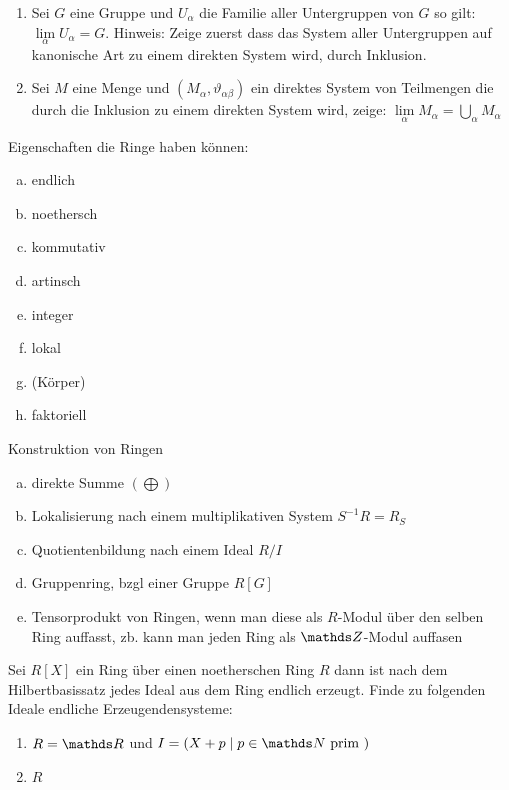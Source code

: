 \documentclass[ngerman, parskip=half, titlepage=false]{scrartcl}
\begin{document}
\begin{Lem} 
  \begin{enumerate}[1)]
  \item Sei $G$ eine Gruppe und $U_\alpha$ die Familie aller
    Untergruppen von $G$ so gilt: $\lim\limits_{\alpha} U_\alpha = G$.
    Hinweis: Zeige zuerst dass das System aller Untergruppen auf kanonische Art
    zu einem direkten System wird, durch Inklusion.
  \item Sei $M$ eine Menge und $(M_\alpha, \vartheta_{\alpha\beta})$
    ein direktes System von Teilmengen die durch die Inklusion zu
    einem direkten System wird, zeige:
    $\lim\limits_{\alpha} M_\alpha = \bigcup\limits_\alpha M_\alpha$
  \end{enumerate}
\end{Lem}

Eigenschaften die Ringe haben können:
\begin{enumerate}[a)]
  \item endlich
  \item noethersch
  \item kommutativ
  \item artinsch
  \item integer
  \item lokal
  \item (Körper)
  \item faktoriell
\end{enumerate}

Konstruktion von Ringen
\begin{enumerate}[a)]
  \item direkte Summe $(\bigoplus)$
  \item Lokalisierung nach einem multiplikativen System  $S^{-1}R = R_S$
  \item Quotientenbildung nach einem Ideal $R/I$
  \item Gruppenring, bzgl einer Gruppe $R[G]$
  \item Tensorprodukt von Ringen, wenn man diese als $R$-Modul über
    den selben Ring auffasst, zb. kann man jeden Ring als $\Z$-Modul auffasen
\end{enumerate}

\begin{Beh}
  Sei $R[X]$ ein Ring über einen noetherschen Ring $R$ dann ist nach
  dem Hilbertbasissatz jedes Ideal aus dem Ring endlich erzeugt. Finde
  zu folgenden Ideale endliche Erzeugendensysteme:\\
  \begin{enumerate}[1)]
  \item $R=\R$ und $I = \left( X + p \; | \;  p \in \N \text{ prim }  \right)$
  \item $R$
  \end{enumerate}
\end{Beh}
\end{document}
